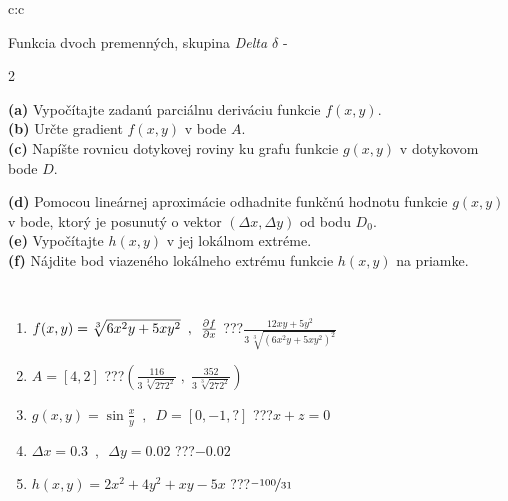 \documentclass[10pt]{report}
\begin{document}
\begin{tabular}{c:c}
\begin{minipage}[c][104.5mm][t]{0.5\linewidth}
\begin{center}
\vspace{7mm}
{\huge \LARGE Funkcia dvoch premenných, skupina \textit{Delta $\delta$} -}\\[5mm]
\begin{minipage}{0.95\linewidth}
\begin{center}
{\small \begin{multicols}{2} \raggedright
\textbf{(a)} Vypočítajte zadanú parciálnu deriváciu funkcie \(f(x,y)\). \\[1mm]
\textbf{(b)} Určte gradient \(f(x,y)\) v bode \(A\). \\[1mm]
\textbf{(c)} Napíšte rovnicu dotykovej roviny ku grafu funkcie \(g(x,y)\) v dotykovom bode \(D\). \par \columnbreak
\textbf{(d)} Pomocou lineárnej aproximácie odhadnite funkčnú hodnotu funkcie \(g(x,y)\) v bode, ktorý je posunutý o vektor \((\Delta x, \Delta y)\) od bodu \(D_0\). \\[1mm]
\textbf{(e)} Vypočítajte \(h(x,y)\) v jej lokálnom extréme. \\[1mm]
\textbf{(f)} Nájdite bod viazeného lokálneho extrému funkcie \(h(x,y)\) na priamke. \\[1mm]
\end{multicols}
}
\end{center}
\end{minipage}
\\[4mm]
\begin{minipage}{0.79\linewidth}
\begin{center}
\begin{varwidth}{\linewidth}
\begin{enumerate}
\normalsizerr
\item $f(x,y) = \sqrt[3]{6x^2y + 5xy^2}\enspace , \enspace \pdv{f}{x}$\quad \dotfill\; ???\;\dotfill \quad $\frac{12xy+5y^2}{3\,\sqrt[3]{(6x^2y+5xy^2)^{2}}}$
\item $A = [4, 2]$\quad \dotfill\; ???\;\dotfill \quad $\left( \frac{116}{3\,\sqrt[3]{272^2}} \;,\; \frac{352}{3\,\sqrt[3]{272^2}} \right)$
\item $g(x,y) = \sin\frac{x}{y} \enspace , \enspace D = [0, -1, ?]$\quad \dotfill\; ???\;\dotfill \quad $x+z=0$
\item $\Delta x = {0.3} \enspace,\enspace \Delta y = {0.02}$\quad \dotfill\; ???\;\dotfill \quad $-0.02$
\item $h(x,y) = 2x^2+4y^2+xy-5x$\quad \dotfill\; ???\;\dotfill \quad $\nicefrac{-100}{31}$

\end{enumerate}
\end{varwidth}
\end{center}
\end{minipage}
\end{center}
\end{minipage}
\end{tabular}
\end{document}
